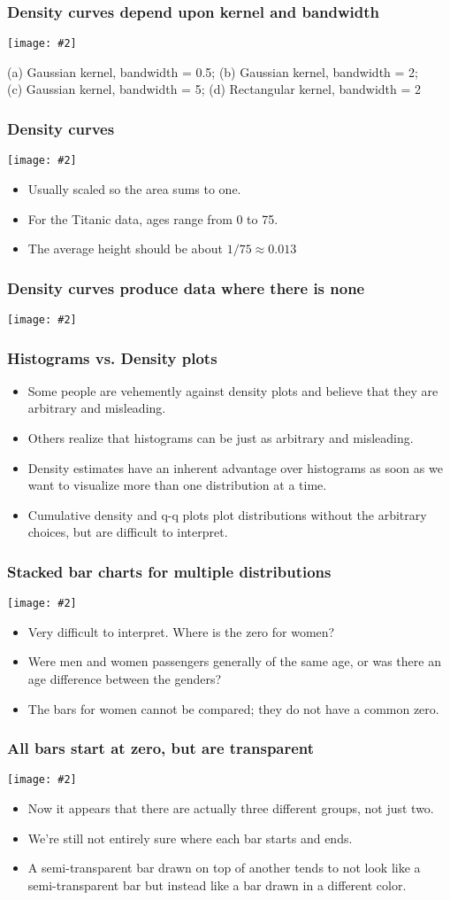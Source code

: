 \documentclass{beamer}
\newcommand{\bi}{\begin{itemize}}
\newcommand{\li}{\item}
\newcommand{\ei}{\end{itemize}}
\newcommand{\fig}[2]{\centerline{\texttt{[image: \#2]}}}
\newcommand{\bfr}[1]{\begin{frame}[fragile]\frametitle{{ #1 }}}
\begin{document}
\bfr{Density curves depend upon kernel and bandwidth}
\fig{1}{titanic-ages-dens-grid-1.png}
\scriptsize

(a) Gaussian kernel, bandwidth = 0.5; (b) Gaussian kernel, bandwidth = 2;\\ (c) Gaussian kernel, bandwidth = 5; (d) Rectangular kernel, bandwidth = 2
\end{frame}

\bfr{Density curves}

\fig{.8}{titanic-ages-dens1-1.png}
\bi
\li Usually scaled so the area sums to one.
\li For the Titanic data, ages range from 0 to 75.
\li The average height should be about $1/75 \approx 0.013$
\ei

\end{frame}

\bfr{Density curves produce data where there is none}

\fig{1}{titanic-ages-dens-negative-1.png}

\end{frame}

\bfr{Histograms vs. Density plots}

\bi
\li Some people are vehemently against density plots and believe that they are arbitrary and misleading.
\li Others realize that histograms can be just as arbitrary and misleading.
\li Density estimates have an inherent advantage over histograms as soon as we want to visualize more than one distribution at a time.
\li Cumulative density and q-q plots plot distributions without the
arbitrary choices, but are difficult to interpret.
\ei
\end{frame}

\bfr{Stacked bar charts for multiple distributions}
\fig{.8}{titanic-age-stacked-hist-1.png}
\scriptsize
\bi
\li Very difficult to interpret.  Where is the zero for women?
\li Were men and women passengers generally of the same age, or was there an age difference between the genders?
\li The bars for women cannot be compared; they do not have a common zero.
\ei
\end{frame}
\scriptsize
\bfr{All bars start at zero, but are transparent}
\fig{0.8}{titanic-age-overlapping-hist-1.png}
\bi
\li Now it appears that there are actually three different groups, not just two.
\li We’re still not entirely sure where each bar starts and ends.
\li A semi-transparent bar drawn on top of another tends to not look like a semi-transparent bar but instead like a bar drawn in a different color.
\ei
\end{frame}
\end{document}
